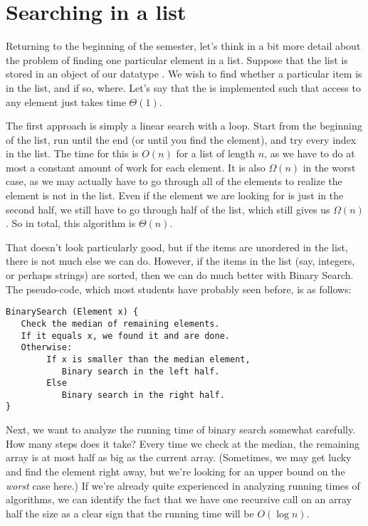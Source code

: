 \section{Searching in a list}
Returning to the beginning of the semester, let's think in a bit more
detail about the problem of finding one particular element in a list.
Suppose that the list is stored in an object of our datatype
. We wish to find whether a particular item is in the list,
and if so, where. Let's say that the  is implemented such that
access to any element just takes time $\Theta(1)$.

The first approach is simply a linear search with a 
loop. Start from the beginning of the list, run until the end (or
until you find the element), and try every index in the list.
The time for this is $O(n)$ for a list of length $n$, as we have to do
at most a constant amount of work for each element.
It is also $\Omega(n)$ in the worst case, as we may actually have to
go through all of the elements to realize the element is not in the
list. Even if the element we are looking for is just in the second
half, we still have to go through half of the list, which still gives
us $\Omega(n)$.  So in total, this algorithm is $\Theta(n)$.

That doesn't look particularly good, but if the items are unordered in
the list, there is not much else we can do. However, if the items in
the list (say, integers, or perhaps strings) are sorted, then we can
do much better with Binary Search.
The pseudo-code, which most students have probably seen before, is as
follows:

\begin{verbatim}
BinarySearch (Element x) {
   Check the median of remaining elements.
   If it equals x, we found it and are done.
   Otherwise:
        If x is smaller than the median element,
           Binary search in the left half.
        Else
           Binary search in the right half.
}
\end{verbatim}

Next, we want to analyze the running time of binary search somewhat
carefully. How many steps does it take?
Every time we check at the median, the remaining array is at most half
as big as the current array. (Sometimes, we may get lucky and find the
element right away, but we're looking for an upper bound on the
\emph{worst} case here.) 
If we're already quite experienced in analyzing running
times of algorithms, we can identify the fact that we have one
recursive call on an array half the size as a clear sign that the
running time will be $O(\log n)$. 


